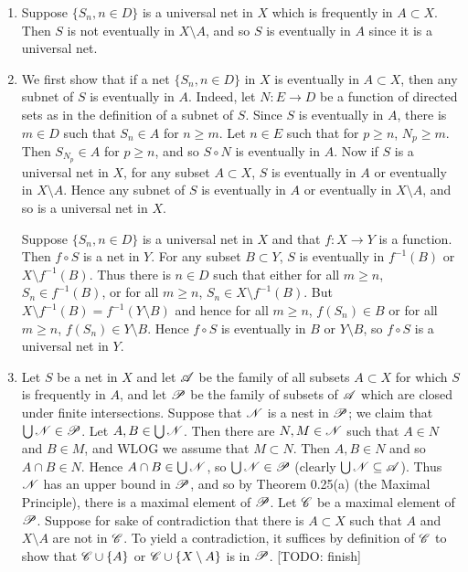 \begin{prob}
\begin{enumerate}
\item Suppose $\{S_n, n \in D\}$ is a universal net in $X$ which is frequently in $A \subset X$. Then $S$ is not eventually in $X\setminus A$, and so $S$ is eventually in $A$ since it is a universal net.

\item We first show that if a net $\{S_n, n \in D\}$ in $X$ is eventually in $A \subset X$, then any subnet of $S$ is eventually in $A$. Indeed, let $N: E \to D$ be a function of directed sets as in the definition of a subnet of $S$. Since $S$ is eventually in $A$, there is $m \in D$ such that $S_n \in A$ for $n \geq m$. Let $n \in E$ such that for $p \geq n$, $N_p \geq m$. Then $S_{N_p} \in A$ for $p \geq n$, and so $S\circ N$ is eventually in $A$. Now if $S$ is a universal net in $X$, for any subset $A \subset X$, $S$ is eventually in $A$ or eventually in $X\setminus A$. Hence any subnet of $S$ is eventually in $A$ or eventually in $X\setminus A$, and so is a universal net in $X$.

Suppose $\{S_n, n \in D\}$ is a universal net in $X$ and that $f: X \to Y$ is a function. Then $f\circ S$ is a net in $Y$. For any subset $B \subset Y$, $S$ is eventually in $f^{-1}(B)$ or $X\setminus f^{-1}(B)$. Thus there is $n \in D$ such that either for all $m \geq n$, $S_n \in f^{-1}(B)$, or for all $m \geq n$, $S_n \in X\setminus f^{-1}(B)$. But $X\setminus f^{-1}(B) = f^{-1}(Y\setminus B)$ and hence for all $m \geq n$, $f(S_n) \in B$ or for all $m \geq n$, $f(S_n) \in Y\setminus B$. Hence $f\circ S$ is eventually in $B$ or $Y\setminus B$, so $f\circ S$ is a universal net in $Y$.

\item Let $S$ be a net in $X$ and let $\mathscr{A}$ be the family of all subsets $A \subset X$ for which $S$ is frequently in $A$, and let $\mathscr{P}$ be the family of subsets of $\mathscr{A}$ which are closed under finite intersections. Suppose that $\mathscr{N}$ is a nest in $\mathscr{P}$; we claim that $\bigcup\mathscr{N} \in \mathscr{P}$. Let $A, B \in \bigcup\mathscr{N}$. Then there are $N, M \in \mathscr{N}$ such that $A \in N$ and $B \in M$, and WLOG we assume that $M \subset N$. Then $A, B \in N$ and so $A\cap B \in N$. Hence $A\cap B \in \bigcup\mathscr{N}$, so $\bigcup\mathscr{N} \in \mathscr{P}$ (clearly $\bigcup\mathscr{N} \subseteq \mathscr{A}$). Thus $\mathscr{N}$ has an upper bound in $\mathscr{P}$, and so by Theorem 0.25(a) (the Maximal Principle), there is a maximal element of $\mathscr{P}$. Let $\mathscr{C}$ be a maximal element of $\mathscr{P}$. Suppose for sake of contradiction that there is $A \subset X$ such that $A$ and $X\setminus A$ are not in $\mathscr{C}$. To yield a contradiction, it suffices by definition of $\mathscr{C}$ to show that $\mathscr{C}\cup\{A\}$ or $\mathscr{C}\cup\{X\setminus A\}$ is in $\mathscr{P}$. [TODO: finish]


\end{enumerate}
\end{prob}
